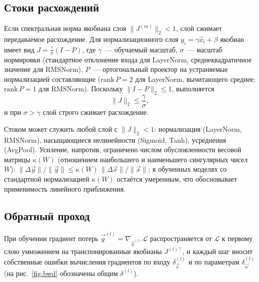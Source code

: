 \subsection{Стоки расхождений}

\begin{statement}\label{st:sink}
    Если спектральная норма якобиана слоя $\|J^{(m)}\|_2<1$, слой сжимает передаваемое
    расхождение. Для нормализационного слоя $y_i=\gamma\hat x_i+\beta$ якобиан имеет
    вид $J=\tfrac{\gamma}{\sigma}(I-P)$, где $\gamma$~--- обучаемый масштаб,
    $\sigma$~--- масштаб нормировки (стандартное отклонение входа для LayerNorm,
    среднеквадратичное значение для RMSNorm), $P$~--- ортогональный проектор на
    устраняемые нормализацией составляющие ($\mathrm{rank}\,P=2$ для LayerNorm,
    вычитающего среднее; $\mathrm{rank}\,P=1$ для RMSNorm). Поскольку
    $\|I-P\|_2\le1$, выполняется
    \begin{equation}
        \label{eq:sink}
        \|J\|_2 \le \frac{\gamma}{\sigma},
    \end{equation}
    и при $\sigma>\gamma$ слой строго сжимает расхождение.
\end{statement}

Стоком может служить любой слой с $\|J\|_2<1$: нормализация (LayerNorm, RMSNorm),
насыщающиеся нелинейности (Sigmoid, Tanh), усреднения (AvgPool). Усиление,
напротив, ограничено числом обусловленности весовой матрицы $\kappa(W)$
(отношением наибольшего и наименьшего сингулярных чисел $W$):
$\|\Delta\Vec{y}\|/\|\Vec{y}\| \le \kappa(W)\,\|\Delta\Vec{x}\|/\|\Vec{x}\|$;
в обученных моделях со стандартной нормализацией $\kappa(W)$ остаётся умеренным,
что обосновывает применимость линейного приближения.

\subsection{Обратный проход}

При обучении градиент потерь $\Vec{g}^{(l)}=\nabla_{\Vec{y}^{(l)}}\mathcal{L}$
распространяется от $\mathcal{L}$ к первому слою умножением на транспонированные
якобианы $J^{(l)\top}$, и каждый шаг вносит собственные ошибки вычисления
градиентов по входу $\delta^{(l)}_{\Vec{x}}$ и по параметрам
$\delta^{(l)}_{\Vec{w}}$ (на рис.~\ref{fig:bwd} обозначены общим $\delta^{(l)}$).

